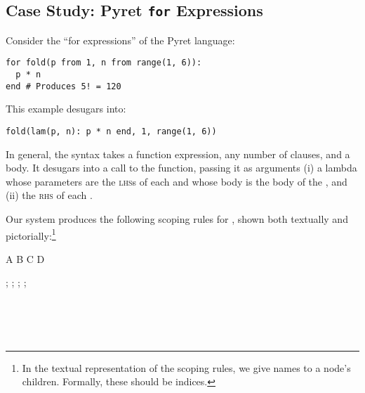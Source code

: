 \subsection{Case Study: Pyret \texttt{for} Expressions}
\label{sec:rscope-for-example}
Consider the ``for expressions'' of the Pyret language:
\begin{verbatim}
for fold(p from 1, n from range(1, 6)):
  p * n
end # Produces 5! = 120
\end{verbatim}
  This example desugars into:
\begin{verbatim}
fold(lam(p, n): p * n end, 1, range(1, 6))
\end{verbatim}
  In general, the  syntax takes a function
  expression, any number of  clauses, and a body. It desugars
  into a call to the function, passing it as arguments (i) a lambda whose
  parameters are the \textsc{lhs}s of each  and whose body
  is the body of the , and (ii) the
  \textsc{rhs} of each .

  Our system produces the following scoping rules for ,
  shown both textually and pictorially:\footnote{
    In the textual representation of the scoping rules, we give names
    to a node's children. Formally, these should be indices.
}

\begin{scopeDescription}
\begin{center}
\begin{tikzScopeDiagram}
  \tikzRoot
    {A}{
      {B}{}
      {C}{}
      {D}{}}
      
  \begin{tikzEdges}
    ;
    ;
    ;
    ;
  \end{tikzEdges}
\end{tikzScopeDiagram}
\end{center}
\begin{ScopeRules}
   \\
   \\
   \\
\end{ScopeRules}
\end{scopeDescription}


